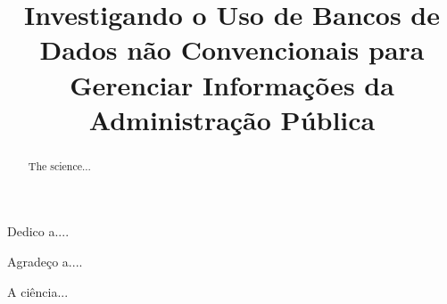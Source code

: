 \documentclass[licenciatura]{unb-cic}
\title{Investigando o {U}so de {B}ancos de {D}ados não {C}onvencionais para 
{G}erenciar {I}nformações da {A}dministração {P}ública}
\begin{document}
  \maketitle
  \pretextual

  \begin{dedicatoria}
  Dedico a....
  \end{dedicatoria}

  \begin{agradecimentos}
  Agradeço a....
  \end{agradecimentos}

  \begin{resumo}
  A ciência...
  \end{resumo}

  \begin{abstract}
  The science...
  \end{abstract}

  \tableofcontents
  \listoffigures
  \listoftables

  \textual
  

  
  
  

  \postextual
  
  
\end{document}
